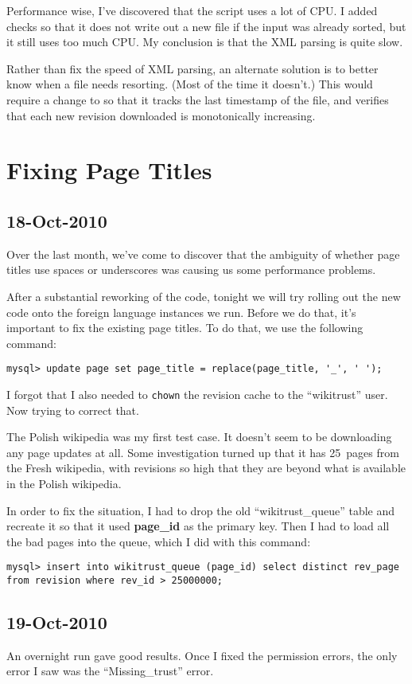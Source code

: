 Performance wise, I've discovered that the 
script uses a lot of CPU.
I added checks so that it does not write out a new file if
the input was already sorted, but it still uses too much CPU.
My conclusion is that the XML parsing is quite slow.

Rather than fix the speed of XML parsing, an alternate solution
is to better know when a file needs resorting.
(Most of the time it doesn't.)
This would require a change to 
so that it tracks the last timestamp of the file,
and verifies that each new revision downloaded is monotonically
increasing.

\section{Fixing Page Titles}

\subsection{18-Oct-2010}

Over the last month, we've come to discover that the ambiguity
of whether page titles use spaces or underscores was causing us
some performance problems.

After a substantial reworking of the code, tonight we will try
rolling out the new code onto the foreign language instances we run.
Before we do that, it's important to fix the existing page titles.
To do that, we use the following command:
\begin{verbatim}
mysql> update page set page_title = replace(page_title, '_', ' ');
\end{verbatim}

I forgot that I also needed to \texttt{chown} the revision cache
to the ``wikitrust'' user.  Now trying to correct that.

The Polish wikipedia was my first test case.
It doesn't seem to be downloading any page updates at all.
Some investigation turned up that it has 25~pages from the
Fresh wikipedia, with revisions so high that they are beyond
what is available in the Polish wikipedia.

In order to fix the situation, I had to drop the old
``wikitrust\_queue'' table and recreate it so that it used
\textbf{page\_id} as the primary key.
Then I had to load all the bad pages into the queue, which
I did with this command:
\begin{verbatim}
mysql> insert into wikitrust_queue (page_id) select distinct rev_page from revision where rev_id > 25000000;
\end{verbatim}

\subsection{19-Oct-2010}

An overnight run gave good results.
Once I fixed the permission errors, the only error I saw was
the ``Missing\_trust'' error.


